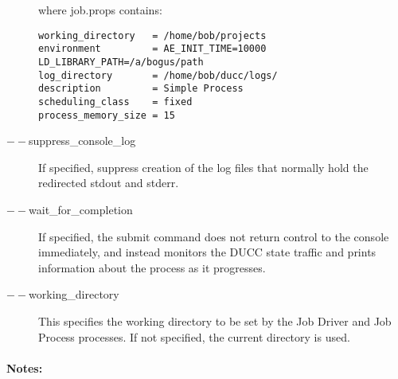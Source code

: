 \begin{description}
          where job.props contains: 
\begin{verbatim}
working_directory   = /home/bob/projects
environment         = AE_INIT_TIME=10000 LD_LIBRARY_PATH=/a/bogus/path 
log_directory       = /home/bob/ducc/logs/ 
description         = Simple Process
scheduling_class    = fixed 
process_memory_size = 15 
\end{verbatim}

        \item[$--$suppress\_console\_log] If specified, suppress creation of the log files that 
          normally hold the redirected stdout and stderr.

        \item[$--$wait\_for\_completion ] If specified, the submit command does not return control to
          the console immediately, and instead monitors the DUCC state traffic and prints
          information about the process as it progresses.
          
        \item[$--$working\_directory ] This specifies the working directory to be set by the Job
          Driver and Job Process processes.  If not specified, the current directory is used.

     \end{description}
        
    \paragraph{Notes:}

